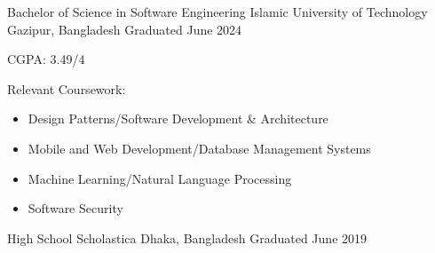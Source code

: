 

\begin{cventries}

  \cventry
    {Bachelor of Science in Software Engineering} %
    {Islamic University of Technology} %
    {Gazipur, Bangladesh} %
    {Graduated June 2024} %
    {
      \begin{cvitems} %
        \item CGPA: 3.49/4
        \item Relevant Coursework: \begin{itemize}[noitemsep]
               \item Design Patterns/Software Development \& Architecture
               \item Mobile and Web Development/Database Management Systems
               \item Machine Learning/Natural Language Processing
               \item Software Security
              \end{itemize}
      \end{cvitems}
    }

  \cventry
    {High School} %
    {Scholastica} %
    {Dhaka, Bangladesh} %
    {Graduated June 2019} %
    {
      \begin{cvitems} %
      \end{cvitems}
    }

\end{cventries}
